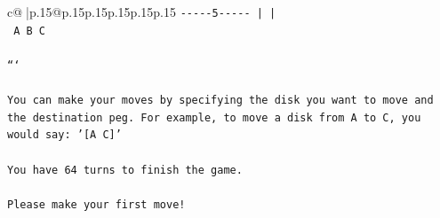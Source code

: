\documentclass{article}
\begin{document}
{\begin{supertabular}{c@{$\;$}|p{.15\linewidth}@{}p{.15\linewidth}p{.15\linewidth}p{.15\linewidth}p{.15\linewidth}p{.15\linewidth}}
{{{\texttt{{-}{-}{-}{-}{-}5{-}{-}{-}{-}{-}      |           |     } \\
\texttt{     A           B           C     } \\
\\ 
\texttt{```} \\
\\ 
\texttt{You can make your moves by specifying the disk you want to move and the destination peg. For example, to move a disk from A to C, you would say: '{[}A C{]}'} \\
\\ 
\texttt{You have 64 turns to finish the game.} \\
\\ 
\texttt{Please make your first move!} \\
            }
        }
    }
     \\ \\


\end{supertabular}}
\end{document}
